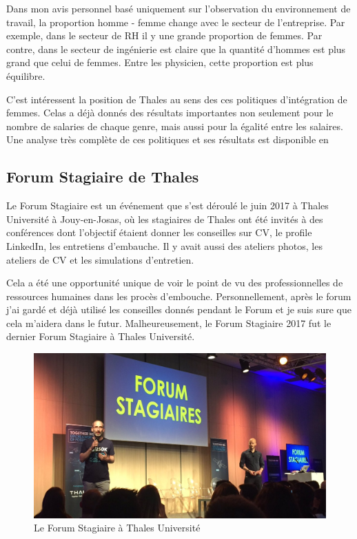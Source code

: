 \documentclass[a4paper, 12pt]{article} %
\begin{document}
Dans mon avis personnel basé uniquement sur l'observation du environnement de travail, la proportion homme - femme change avec le secteur de l'entreprise. Par exemple, dans le secteur de RH il y une grande proportion de femmes. Par contre, dans le secteur de ingénierie est claire que la quantité d'hommes est plus grand que celui de femmes. Entre les physicien, cette proportion est plus équilibre. 

C'est intéressent la position de Thales au sens des ces politiques d'intégration de femmes. Celas a déjà donnés des résultats importantes non seulement pour le nombre de salaries de chaque genre, mais aussi pour la égalité entre les salaires. Une analyse très complète de ces politiques et ses résultats est disponible en \cite{thales}

\subsection{Forum Stagiaire de Thales}
Le Forum Stagiaire est un événement que s'est déroulé le juin 2017 à Thales Université à Jouy-en-Josas, où les stagiaires de Thales ont été invités à des conférences dont l'objectif étaient donner les conseilles sur CV, le profile LinkedIn, les entretiens d'embauche. Il y avait aussi des ateliers photos, les ateliers de CV et les simulations d'entretien.

Cela a été une opportunité unique de voir le point de vu des professionnelles de ressources humaines dans les procès d'embouche. Personnellement, après le forum j'ai gardé et déjà utilisé les conseilles donnés pendant le Forum et je suis sure que cela m'aidera dans le futur. Malheureusement, le Forum Stagiaire 2017 fut le dernier Forum Stagiaire à Thales Université.

\begin{figure}[H]
	\centering
	\includegraphics[width=\textwidth]{images/forum_stagiare.jpg}
	\caption{Le Forum Stagiaire à Thales Université}
	\label{forum_stagiare}
\end{figure}
\end{document}
